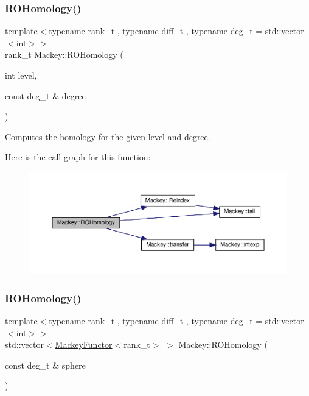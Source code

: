 \subsubsection{\texorpdfstring{R\+O\+Homology()}{ROHomology()}\hspace{0.1cm}{\footnotesize\ttfamily [1/2]}}
{\footnotesize\ttfamily template$<$typename rank\+\_\+t , typename diff\+\_\+t , typename deg\+\_\+t  = std\+::vector$<$int$>$$>$ \\
rank\+\_\+t Mackey\+::\+R\+O\+Homology (\begin{DoxyParamCaption}\item[{int}]{level,  }\item[{const deg\+\_\+t \&}]{degree }\end{DoxyParamCaption})}



Computes the homology for the given level and degree. 

Here is the call graph for this function\+:\nopagebreak
\begin{figure}[H]
\begin{center}
\leavevmode
\includegraphics[width=350pt]{namespaceMackey_aa014e2177bd124bce2e8e7a4c1dc8d38_cgraph}
\end{center}
\end{figure}
\mbox{\label{namespaceMackey_a58708ee937b0c4172b7cde8e5f856504}} 
\subsubsection{\texorpdfstring{R\+O\+Homology()}{ROHomology()}\hspace{0.1cm}{\footnotesize\ttfamily [2/2]}}
{\footnotesize\ttfamily template$<$typename rank\+\_\+t , typename diff\+\_\+t , typename deg\+\_\+t  = std\+::vector$<$int$>$$>$ \\
std\+::vector$<$\hyperlink{classMackey_1_1MackeyFunctor}{Mackey\+Functor}$<$rank\+\_\+t$>$ $>$ Mackey\+::\+R\+O\+Homology (\begin{DoxyParamCaption}\item[{const deg\+\_\+t \&}]{sphere }\end{DoxyParamCaption})}



